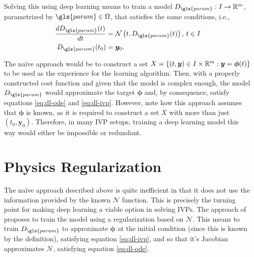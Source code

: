 Solving this using deep learning means to train a model $D_{\gls{param}}:I\to \R^{m}$, parametrized by $\gls{param}\in \Omega$, that satisfies the same conditions, i.e.,
\begin{align}
    \frac{d D_{\gls{param}}(t)}{d t} &= \mathcal{N}\left( t, D_{\gls{param}}(t) \right),\,t\in I \label{eq:dl-ode} \\
    D_{\gls{param}}(t_0) &= \bm{y}_0 \label{eq:dl-ivp}
.\end{align}

The naïve approach would be to construct a set $X=\left\{ (t,\bm{y})\in I\times \mathbb{R}^{m}: \bm{y}=\bm{\phi}(t) \right\} $ to be used as the experience for the learning algorithm.
Then, with a properly constructed cost function and given that the model is complex enough, the model $D_{\gls{param}}$ would approximate the target $\bm{\phi}$ and, by consequence, satisfy equations \eqref{eq:dl-ode} and \eqref{eq:dl-ivp}.
However, note how this approach assumes that $\bm{\phi}$ is known, as it is required to construct a set $X$ with more than just $\left( t_0,\bm{y}_0 \right) $.
Therefore, in many \gls{IVP} setups, training a deep learning model this way would either be impossible or redundant.

\section{Physics Regularization}

The naïve approach described above is quite inefficient in that it does not use the information provided by the known $\mathcal{N}$ function.
This is precisely the turning point for making deep learning a viable option in solving \gls{IVP}s.
The approach of \textcite{Raissi2019} proposes to train the model using a regularization based on $\mathcal{N}$.
This means to train $D_{\gls{param}}$ to approximate $\bm{\phi}$ at the initial condition (since this is known by the definition), satisfying equation \eqref{eq:dl-ivp}, and so that it's Jacobian approximates $\mathcal{N}$, satisfying equation \eqref{eq:dl-ode}.

